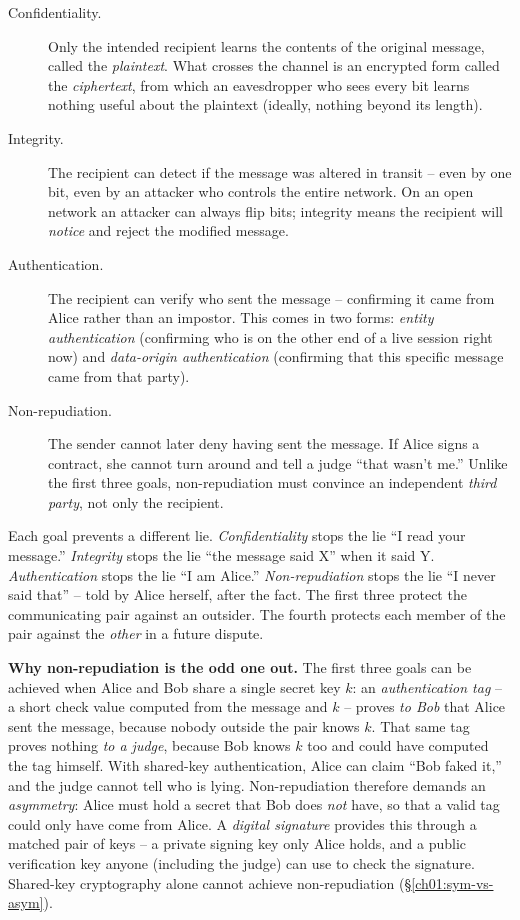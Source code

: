 \begin{description}
  \item[Confidentiality.] Only the intended recipient learns the contents of the original message, called the \emph{plaintext}. What crosses the channel is an encrypted form called the \emph{ciphertext}, from which an eavesdropper who sees every bit learns nothing useful about the plaintext (ideally, nothing beyond its length).
  \item[Integrity.] The recipient can detect if the message was altered in transit -- even by one bit, even by an attacker who controls the entire network. On an open network an attacker can always flip bits; integrity means the recipient will \emph{notice} and reject the modified message.
  \item[Authentication.] The recipient can verify who sent the message -- confirming it came from Alice rather than an impostor. This comes in two forms: \emph{entity authentication} (confirming who is on the other end of a live session right now) and \emph{data-origin authentication} (confirming that this specific message came from that party).
  \item[Non-repudiation.] The sender cannot later deny having sent the message. If Alice signs a contract, she cannot turn around and tell a judge ``that wasn't me.'' Unlike the first three goals, non-repudiation must convince an independent \emph{third party}, not only the recipient.
\end{description}

\begin{intuitionbox}
Each goal prevents a different lie.
\emph{Confidentiality} stops the lie ``I read your message.'' \emph{Integrity} stops the lie ``the message said X'' when it said Y. \emph{Authentication} stops the lie ``I am Alice.'' \emph{Non-repudiation} stops the lie ``I never said that'' -- told by Alice herself, after the fact. The first three protect the communicating pair against an outsider. The fourth protects each member of the pair against the \emph{other} in a future dispute.
\end{intuitionbox}

\begin{whybox}
\textbf{Why non-repudiation is the odd one out.} The first three goals can be achieved when Alice and Bob share a single secret key $k$: an \emph{authentication tag} -- a short check value computed from the message and $k$ -- proves \emph{to Bob} that Alice sent the message, because nobody outside the pair knows $k$. That same tag proves nothing \emph{to a judge}, because Bob knows $k$ too and could have computed the tag himself. With shared-key authentication, Alice can claim ``Bob faked it,'' and the judge cannot tell who is lying. Non-repudiation therefore demands an \emph{asymmetry}: Alice must hold a secret that Bob does \emph{not} have, so that a valid tag could only have come from Alice. A \emph{digital signature} provides this through a matched pair of keys -- a private signing key only Alice holds, and a public verification key anyone (including the judge) can use to check the signature. Shared-key cryptography alone cannot achieve non-repudiation (\S\ref{ch01:sym-vs-asym}).
\end{whybox}

